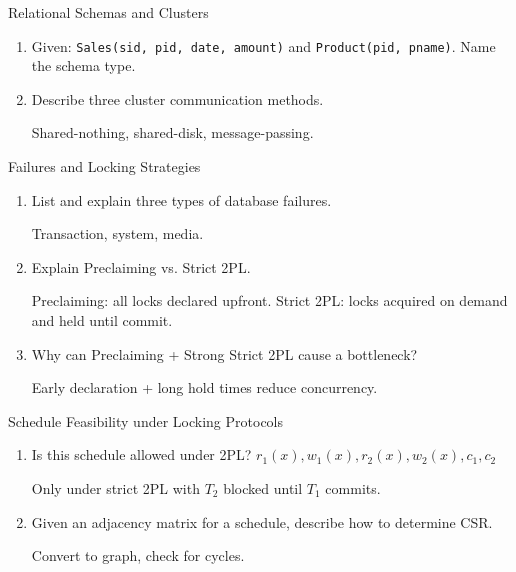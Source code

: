 \documentclass{article}
\begin{document}
\begin{exercise}{Relational Schemas and Clusters}
  \begin{enumerate}
    \item Given: \texttt{Sales(sid, pid, date, amount)} and \texttt{Product(pid, pname)}. Name the schema type. 
    \item Describe three cluster communication methods. \begin{solution}
      Shared-nothing, shared-disk, message-passing.
    \end{solution}
  \end{enumerate}
\end{exercise}

\begin{exercise}{Failures and Locking Strategies}
  \begin{enumerate}
    \item List and explain three types of database failures. \begin{solution}
      Transaction, system, media.
    \end{solution}
    \item Explain Preclaiming vs. Strict 2PL. \begin{solution}
      Preclaiming: all locks declared upfront. Strict 2PL: locks acquired on demand and held until commit.
    \end{solution}
    \item Why can Preclaiming + Strong Strict 2PL cause a bottleneck? \begin{solution}
      Early declaration + long hold times reduce concurrency.
    \end{solution}
  \end{enumerate}
\end{exercise}

\begin{exercise}{Schedule Feasibility under Locking Protocols}
  \begin{enumerate}
    \item Is this schedule allowed under 2PL? $r_1(x), w_1(x), r_2(x), w_2(x), c_1, c_2$ \begin{solution}
      Only under strict 2PL with $T_2$ blocked until $T_1$ commits.
    \end{solution}
    \item Given an adjacency matrix for a schedule, describe how to determine CSR. \begin{solution}
      Convert to graph, check for cycles.
    \end{solution}
  \end{enumerate}
\end{exercise}
\end{document}
